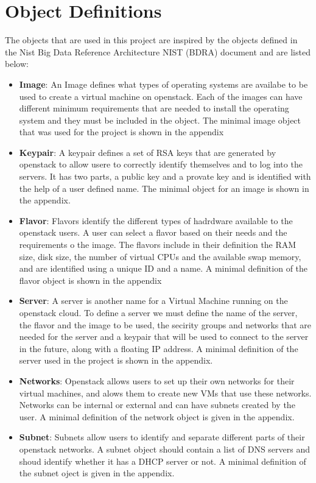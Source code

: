 \section{Object Definitions}
The objects that are used in this project are inspired by the objects defined in the Nist Big Data Reference Architecture NIST (BDRA) document and are listed below:

\begin{itemize}
\item \textbf{Image}: An Image defines what types of operating systems are
availabe to be used to create a virtual machine on openstack. Each of
the images can have different minimum requirements that are needed to
install the operating system and they must be included in the
object. The minimal image object that was used for the project is
shown in the appendix

\item \textbf{Keypair}: A keypair defines a set of RSA keys that are
generated by openstack to allow usere to correctly identify themselves
and to log into the servers. It has two parts, a public key and a
provate key and is identified with the help of a user defined
name. The minimal object for an image is shown in the appendix.

\item \textbf{Flavor}: Flavors identify the different types of hadrdware
available to the openstack users. A user can select a flavor based on
their needs and the requirements o the image. The flavors include in
their definition the RAM size, disk size, the number of virtual CPUs
and the available swap memory, and are identified using a unique ID
and a name.  A minimal definition of the flavor object is shown in the
appendix

\item \textbf{Server}: A server is another name for a Virtual Machine
running on the openstack cloud. To define a server we must define the
name of the server, the flavor and the image to be used, the secirity
groups and networks that are needed for the server and a keypair that
will be used to connect to the server in the future, along with a
floating IP address. A minimal definition of the server used in the
project is shown in the appendix.

\item \textbf{Networks}: Openstack allows users to set up their own
networks for their virtual machines, and alows them to create new VMs
that use these networks. Networks can be internal or external and can
have subnets created by the user. A minimal definition of the network
object is given in the appendix.

\item \textbf{Subnet}: Subnets allow users to identify and separate
different parts of their openstack networks. A subnet object should
contain a list of DNS servers and shoud identify whether it has a DHCP
server or not.  A minimal definition of the subnet oject is given in
the appendix.
\end{itemize}




